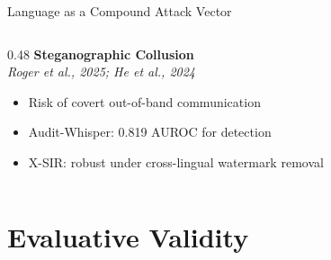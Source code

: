 \documentclass[11pt,aspectratio=169]{beamer}
\begin{document}
\begin{frame}{Language as a Compound Attack Vector}
\begin{columns}[T]
\begin{column}{0.48\textwidth}
            \vspace{0.3cm}
            \textbf{\textcolor{successgreen}{Steganographic Collusion}}\\
            {\small \textit{Roger et al., 2025; He et al., 2024}}
            \begin{itemize}
                \item Risk of covert out-of-band communication
                \item Audit-Whisper: 0.819 AUROC for detection
                \item X-SIR: robust under cross-lingual watermark removal
            \end{itemize}
        \end{column}
    \end{columns}
\end{frame}

\section{Evaluative Validity}
\end{document}
